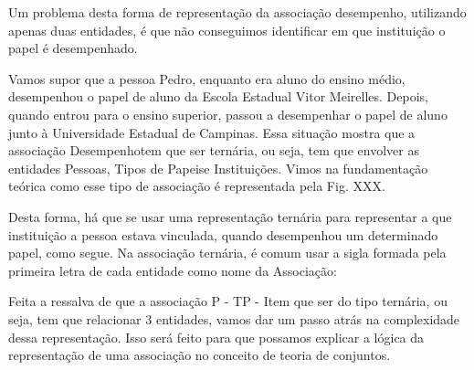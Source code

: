 \documentclass[
12pt,		%
openright,	%
twoside,  %
a4paper,			%
chapter=TITLE,		%
english,			%
french,				%
spanish,			%
brazil				%
]{USPSC-classe/USPSC}
\begin{document}
Um problema desta forma de representa\c{c}\~ao da associa\c{c}\~ao desempenho, utilizando apenas duas entidades, \'e que n\~ao conseguimos identificar em que institui\c{c}\~ao o papel \'e desempenhado.









Vamos supor que a pessoa \textquotedbl Pedro\textquotedbl , enquanto era aluno do ensino m\'edio, desempenhou o papel de aluno da Escola Estadual Vitor Meirelles. Depois, quando entrou para o ensino superior, passou a desempenhar o papel de aluno junto \`a Universidade Estadual de Campinas. Essa situa\c{c}\~ao mostra que a associa\c{c}\~ao \textquotedbl Desempenho\textquotedbl  tem que ser tern\'aria, ou seja, tem que envolver as entidades \textquotedbl Pessoas\textquotedbl , \textquotedbl Tipos de Papeis\textquotedbl  e \textquotedbl Institui\c{c}\~oes\textquotedbl . Vimos na fundamenta\c{c}\~ao te\'orica como esse tipo de associa\c{c}\~ao \'e representada pela Fig. XXX.









Desta forma, h\'a que se usar uma representa\c{c}\~ao tern\'aria para representar \textquotedbl a que institui\c{c}\~ao a pessoa estava vinculada, quando desempenhou um determinado papel\textquotedbl , como segue. Na associa\c{c}\~ao tern\'aria, \'e comum usar a sigla formada pela primeira letra de cada entidade como nome da Associa\c{c}\~ao:











Feita a ressalva de que a associa\c{c}\~ao \textquotedbl P - TP - I\textquotedbl  tem que ser do tipo tern\'aria, ou seja, tem que relacionar 3 entidades, vamos dar um passo atr\'as na complexidade dessa representa\c{c}\~ao. Isso ser\'a feito para que possamos explicar a l\'ogica da representa\c{c}\~ao de uma associa\c{c}\~ao no conceito de teoria de conjuntos.
\end{document}
